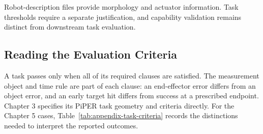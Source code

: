 Robot-description files provide morphology and actuator information.
Task thresholds require a separate justification, and capability validation
remains distinct from downstream task evaluation.

\subsection{Reading the Evaluation Criteria}
\label{sec:appendix-evaluation-criteria}

A task passes only when all of its required clauses are satisfied.
The measurement object and time rule are part of each clause:
an end-effector error differs from an object error, and an early target hit
differs from success at a prescribed endpoint.
Chapter 3 specifies its PiPER task geometry and criteria directly.
For the Chapter 5 cases,
Table~\ref{tab:appendix-task-criteria} records the distinctions needed to
interpret the reported outcomes.

